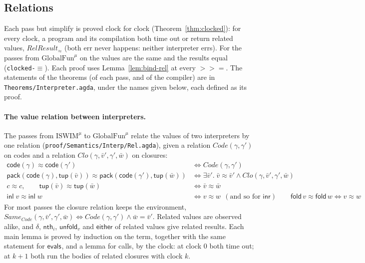 \documentclass[10pt]{article}
\theoremstyle{acmplain}
\newcommand{\key}[1]{\mathsf{#1}}
\newcommand{\tupV}[1]{\key{tup}(#1)}
\newcommand{\inlV}{\key{inl}\;}
\newcommand{\bind}{\mathbin{>\!\!>\!\!=}}
\newcommand{\RelRes}[1]{\mathit{RelResult}_{#1}}
\newcommand{\EVS}[2]{\key{evals}^{#1}_{#2}}
\newcommand{\Tpack}[2]{\key{pack}(#1, #2)}     %
\newcommand{\Same}{\mathit{Same}}
\newcommand{\TcodeV}[1]{\key{code}(#1)}                   %
\newcommand{\Ml}[1]{\textrm{#1}^{\mu}}                  %
\newcommand{\Mfold}{\key{fold}\,}
\begin{document}
\subsection{Relations}\label{sec:m-interp-rel}

Each pass but simplify is proved clock for clock (Theorem~\ref{thm:clocked}):
for every clock, a program and its compilation both time out or return
related values, $\RelRes{\approx}$ (both err never happens: neither
interpreter errs). For the passes from $\Ml{GlobalFun}$ on the values are the
same and the results equal (\texttt{clocked-$\equiv$}). Each proof uses
Lemma~\ref{lem:bind-rel} at every $\bind$. The statements of the theorems
(of each pass, and of the compiler) are in
\texttt{Theorems/\allowbreak Interpreter.agda}, under the names given below, each
defined as its proof.

\paragraph{The value relation between interpreters.}
The passes from $\Ml{ISWIM}$ to $\Ml{GlobalFun}$ relate the values of two
interpreters by one relation (\texttt{proof/Semantics/Interp/Rel.agda}),
given a relation $\mathit{Code}(\gamma, \gamma')$ on codes and a relation
$\mathit{Clo}(\gamma, \bar{v}', \gamma', \bar{w})$ on closures:
\begin{align*}
  \TcodeV{\gamma} \approx \TcodeV{\gamma'} &\iff \mathit{Code}(\gamma, \gamma') \\
  \Tpack{\TcodeV{\gamma}}{\tupV{\bar{v}}} \approx \Tpack{\TcodeV{\gamma'}}{\tupV{\bar{w}}}
    &\iff \exists \bar{v}'.\; \bar{v} \approx \bar{v}' \land \mathit{Clo}(\gamma, \bar{v}', \gamma', \bar{w}) \\
  c \approx c, \qquad
  \tupV{\bar{v}} \approx \tupV{\bar{w}} &\iff \bar{v} \approx \bar{w} \\
  \inlV v \approx \inlV w &\iff v \approx w \ \ (\text{and so for } \key{inr}) \qquad
  \Mfold v \approx \Mfold w \iff v \approx w
\end{align*}
For most passes the closure relation keeps the environment,
$\Same_{\mathit{Code}}(\gamma, \bar{v}', \gamma', \bar{w}) \iff
\mathit{Code}(\gamma, \gamma') \land \bar{w} = \bar{v}'$. Related values are
observed alike, and $\delta$, $\key{nth}_i$, $\key{unfold}_v$ and
$\key{either}$ of related values give related results. Each main lemma is
proved by induction on the term, together with the same statement for
$\EVS{}{}$, and a lemma for calls, by the clock: at clock $0$ both time
out; at $k + 1$ both run the bodies of related closures with clock $k$.
\end{document}

